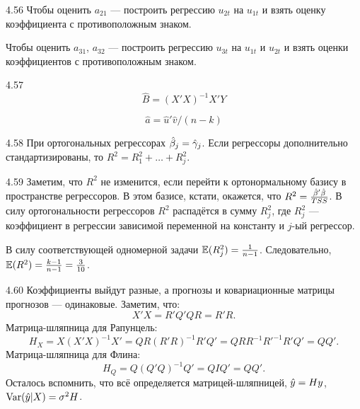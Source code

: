 \protect \hypertarget {soln:4.56}{}
\begin{solution}{{4.56}}
Чтобы оценить $a_{21}$ — построить регрессию $u_{2t}$ на $u_{1t}$ и взять оценку коэффициента с противоположным знаком.

Чтобы оценить $a_{31}$, $a_{32}$ — построить регрессию $u_{3t}$ на $u_{1t}$ и $u_{2t}$ и взять оценки коэффициентов с противоположным знаком.
\end{solution}
\protect \hypertarget {soln:4.57}{}
\begin{solution}{{4.57}}
\[
\hat B = (X'X)^{-1}X'Y
\]

\[
\hat a = \hat u' \hat v / (n - k)
\]
\end{solution}
\protect \hypertarget {soln:4.58}{}
\begin{solution}{{4.58}}
При ортогональных регрессорах $\hat{\beta}_j = \hat\gamma_j$. Если регрессоры дополнительно стандартизированы, то $R^2 = R^2_1 + \ldots + R^2_j$.
\end{solution}
\protect \hypertarget {soln:4.59}{}
\begin{solution}{{4.59}}
Заметим, что $R^2$ не изменится, если перейти к ортонормальному базису в пространстве регрессоров. В этом базисе, кстати, окажется, что $R^2 = \frac{\hat{\beta}'\hat{\beta}}{TSS}$. В силу ортогональности регрессоров $R^2$ распадётся в сумму $R^2_j$, где $R^2_j$ — коэффициент в регрессии зависимой переменной на константу и $j$-ый регрессор.

В силу соответствующей одномерной задачи $\mathbb{E}(R^2_j) = \frac{1}{n-1}$. Следовательно, $\mathbb{E}(R^2) = \frac{k-1}{n-1}=\frac{3}{10}$.
\end{solution}
\protect \hypertarget {soln:4.60}{}
\begin{solution}{{4.60}}
Коэффициенты выйдут разные, а прогнозы и ковариационные матрицы прогнозов — одинаковые.
Заметим, что:
\[
X'X = R'Q'QR=R'R.
\]
Матрица-шляпница для Рапунцель:
\[
H_X = X(X'X)^{-1}X'=QR(R'R)^{-1}R'Q' = QRR^{-1}R'^{-1}R'Q'=QQ'.
\]
Матрица-шляпница для Флина:
\[
H_Q = Q(Q'Q)^{-1}Q' = QIQ'=QQ'.
\]
Осталось вспомнить, что всё определяется матрицей-шляпницей, $\hat{y}=Hy$, $\operatorname{Var}(\hat{y}|X)=\sigma^2 H$.
\end{solution}

